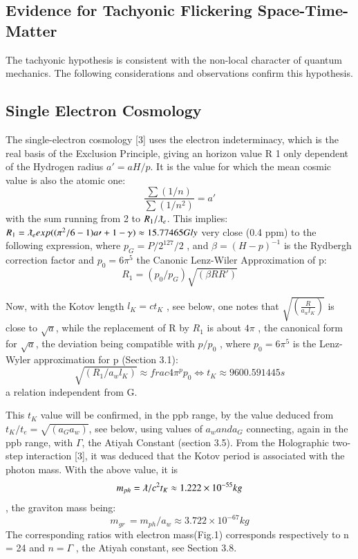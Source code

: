 \documentclass[twoside,draft]{article}
\begin{document}
{\subsection{Evidence for Tachyonic Flickering Space-Time-Matter}

The tachyonic hypothesis is consistent with the non-local character of quantum mechanics. The
following considerations and observations confirm this hypothesis.

\subsection{Single Electron Cosmology}

The single-electron cosmology [3] uses the electron indeterminacy, which is the real basis of the
Exclusion Principle, giving an horizon value R 1 only dependent of the Hydrogen radius $a\prime = aH/p$. It
is the value for which the mean cosmic value is also the atomic one:
\begin{equation}
\frac{\sum(1/n)}{\sum(1/n^{2})} = a\prime
\end{equation}
with the sum running from 2 to $R_{1} /\lambdabar_{e}$. This implies:
$R_{1} = \lambdabar_{e} exp((\pi^{2} /6 - 1)a\prime + 1 - \gamma) \approx 15.77465 Gly$
very close (0.4 ppm) to the following expression, where $p_{G} = P/2^{127}/2$ , and $\beta = (H - p)^{-1}$ is the
Rydbergh correction factor and $p_{0} = 6\pi^{5}$ the Canonic Lenz-Wiler Approximation of p:
\begin{equation}
R_{1} = ( p_{0} /p_{G} ) \sqrt{(\beta R R\prime)}
\end{equation}

Now, with the Kotov length $l_{K} = ct_{K}$ , see below, one notes that $\sqrt{(\frac{R}{a_{w} l_{K}})}$ is close to $\sqrt{a}$, while
the replacement of R by $R_{1}$ is about $4\pi$ , the canonical form for $\sqrt{a}$, the deviation being compatible
with $p/p_{0}$ , where $p_{0} = 6\pi^{5}$ is the Lenz-Wyler approximation for p (Section 3.1):
$$\sqrt{(R_{1} /a_{w} l_{K})} \approx frac{4\pi^{p}}{p_{0}} \Leftrightarrow t_{K} \approx 9 600.591445 s$$ a relation independent from G. 

This $t_K$ value will be confirmed, in the ppb range, by the value
deduced from $t_{K} /t_{e} = \sqrt{(a_{G} a_{w})}$, see below, using values of $a_{w} and a_{G}$ connecting, again in the ppb
range, with $\Gamma$, the Atiyah Constant (section 3.5).
From the Holographic two-step interaction [3], it was deduced that the Kotov period is
associated with the photon mass. With the above value, it is $$m_{ph} = \lambdabar/c^{2} t_{K} \approx 1.222 \times 10^{-55} kg$$, the
graviton mass being: 
\begin{equation}
m_{gr}\, = m_{ph} /a_{w} \approx 3.722 \times 10^{-67} kg
\end{equation} 
The corresponding ratios with electron mass(Fig.1) corresponds respectively to n = 24 and $n = \Gamma$ , the Atiyah constant, see Section 3.8.

}
\end{document}
